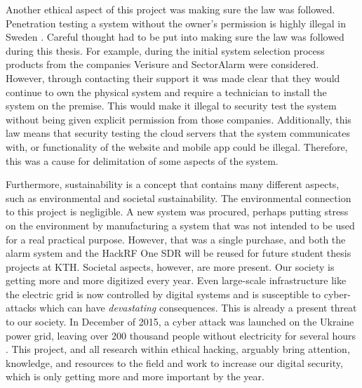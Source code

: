 Another ethical aspect of this project was making sure the law was followed. Penetration testing a system without the owner's permission is highly illegal in Sweden \cite{brottsbalken-it-brott}. Careful thought had to be put into making sure the law was followed during this thesis. For example, during the initial system selection process products from the companies Verisure and SectorAlarm were considered. However, through contacting their support it was made clear that they would continue to own the physical system and require a technician to install the system on the premise. This would make it illegal to security test the system without being given explicit permission from those companies. Additionally, this law means that security testing the cloud servers that the system communicates with, or functionality of the website and mobile app could be illegal. Therefore, this was a cause for delimitation of some aspects of the system.

Furthermore, sustainability is a concept that contains many different aspects, such as environmental and societal sustainability. The environmental connection to this project is negligible. A new system was procured, perhaps putting stress on the environment by manufacturing a system that was not intended to be used for a real practical purpose. However, that was a single purchase, and both the alarm system and the HackRF One SDR will be reused for future student thesis projects at KTH. Societal aspects, however, are more present. Our society is getting more and more digitized every year. Even large-scale infrastructure like the electric grid is now controlled by digital systems and is susceptible to cyber-attacks which can have \textit{devastating} consequences. This is already a present threat to our society. In December of 2015, a cyber attack was launched on the Ukraine power grid, leaving over 200 thousand people without electricity for several hours \cite{urkaine-power-grid-analysis}. This project, and all research within ethical hacking, arguably bring attention, knowledge, and resources to the field and work to increase our digital security, which is only getting more and more important by the year.
